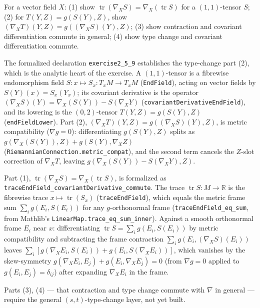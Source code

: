 \begin{remark}
  \label{rem:pet-ch2-ex-9}
  \leanok
  For a vector field $X$: (1) show $\operatorname{tr}(\nabla_XS)=\nabla_X(\operatorname{tr}S)$
  for a $(1,1)$-tensor $S$; (2) for $T(Y,Z)=g(S(Y),Z)$, show
  $(\nabla_XT)(Y,Z)=g((\nabla_XS)(Y),Z)$; (3) show contraction and covariant
  differentiation commute in general; (4) show type change and covariant
  differentiation commute.

  The formalized declaration \texttt{exercise2\_5\_9} establishes the type-change
  part (2), which is the analytic heart of the exercise. A $(1,1)$-tensor is a
  fibrewise endomorphism field $S:x\mapsto S_x:T_xM\to T_xM$
  (\texttt{EndField}), acting on vector fields by $S(Y)(x)=S_x(Y_x)$; its covariant
  derivative is the operator $(\nabla_XS)(Y)=\nabla_X(S(Y))-S(\nabla_XY)$
  (\texttt{covariantDerivativeEndField}), and its lowering is the $(0,2)$-tensor
  $T(Y,Z)=g(S(Y),Z)$ (\texttt{endFieldLower}). Part (2),
  $(\nabla_XT)(Y,Z)=g((\nabla_XS)(Y),Z)$, is metric compatibility ($\nabla g=0$):
  differentiating $g(S(Y),Z)$ splits as $g(\nabla_X(S(Y)),Z)+g(S(Y),\nabla_XZ)$
  (\texttt{RiemannianConnection.metric\_compat}), and the second term cancels the
  $Z$-slot correction of $\nabla_XT$, leaving
  $g(\nabla_X(S(Y))-S(\nabla_XY),Z)$.

  Part (1), $\operatorname{tr}(\nabla_XS)=\nabla_X(\operatorname{tr}S)$, is
  formalized as \texttt{traceEndField\_covariantDerivative\_commute}. The trace
  $\operatorname{tr}S:M\to\mathbb R$ is the fibrewise trace
  $x\mapsto\operatorname{tr}(S_x)$ (\texttt{traceEndField}), which equals the metric
  frame sum $\sum_i g(E_i,S(E_i))$ for any $g$-orthonormal frame
  (\texttt{traceEndField\_eq\_sum}, from Mathlib's \texttt{LinearMap.trace\_eq\_sum\_inner}).
  Against a smooth orthonormal frame $E_i$ near $x$: differentiating
  $\operatorname{tr}S=\sum_i g(E_i,S(E_i))$ by metric compatibility and subtracting
  the frame contraction $\sum_i g(E_i,(\nabla_XS)(E_i))$ leaves
  $\sum_i[g(\nabla_XE_i,S(E_i))+g(E_i,S(\nabla_XE_i))]$, which vanishes by the
  skew-symmetry $g(\nabla_XE_i,E_j)+g(E_i,\nabla_XE_j)=0$ (from $\nabla g=0$ applied
  to $g(E_i,E_j)=\delta_{ij}$) after expanding $\nabla_XE_i$ in the frame.

  Parts (3), (4) — that contraction and type change commute with $\nabla$ in
  general — require the general $(s,t)$-type-change layer, not yet built.
\end{remark}

